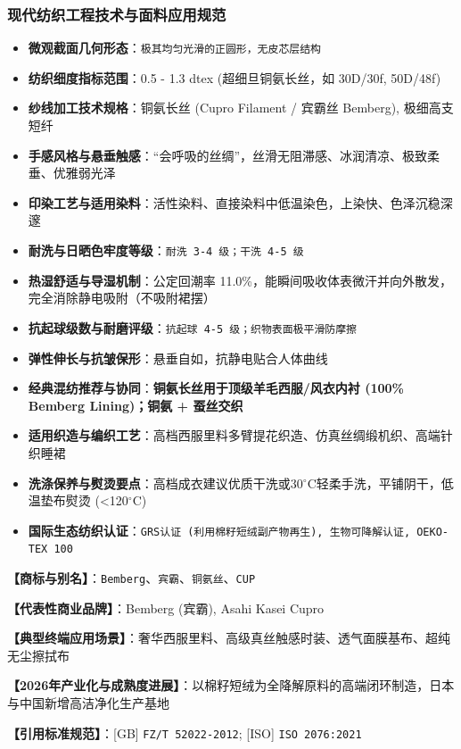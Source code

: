 \documentclass[11pt,openright,twoside,UTF8]{ctexbook}
\begin{document}
\subsubsection*{现代纺织工程技术与面料应用规范}
\begin{itemize} \setlength{\itemsep}{2pt}
    \item \textbf{微观截面几何形态}：\texttt{极其均匀光滑的正圆形，无皮芯层结构}
    \item \textbf{纺织细度指标范围}：0.5 - 1.3 dtex (超细旦铜氨长丝，如 30D/30f, 50D/48f)
    \item \textbf{纱线加工技术规格}：铜氨长丝 (Cupro Filament / 宾霸丝 Bemberg), 极细高支短纤
    \item \textbf{手感风格与悬垂触感}：“会呼吸的丝绸”，丝滑无阻滞感、冰润清凉、极致柔垂、优雅弱光泽
    \item \textbf{印染工艺与适用染料}：活性染料、直接染料中低温染色，上染快、色泽沉稳深邃
    \item \textbf{耐洗与日晒色牢度等级}：\texttt{耐洗 3-4 级；干洗 4-5 级}
    \item \textbf{热湿舒适与导湿机制}：公定回潮率 11.0\%，能瞬间吸收体表微汗并向外散发，完全消除静电吸附（不吸附裙摆）
    \item \textbf{抗起球级数与耐磨评级}：\texttt{抗起球 4-5 级；织物表面极平滑防摩擦}
    \item \textbf{弹性伸长与抗皱保形}：悬垂自如，抗静电贴合人体曲线
    \item \textbf{经典混纺推荐与协同}：\textbf{铜氨长丝用于顶级羊毛西服/风衣内衬 (100\% Bemberg Lining)；铜氨 + 蚕丝交织}
    \item \textbf{适用织造与编织工艺}：高档西服里料多臂提花织造、仿真丝绸缎机织、高端针织睡裙
    \item \textbf{洗涤保养与熨烫要点}：高档成衣建议优质干洗或30$^\circ\mathrm{C}$轻柔手洗，平铺阴干，低温垫布熨烫 (\textless{}120$^\circ\mathrm{C}$)
    \item \textbf{国际生态纺织认证}：\texttt{GRS认证 (利用棉籽短绒副产物再生), 生物可降解认证, OEKO-TEX 100}
\end{itemize}
\vspace{0.2cm}

\noindent\textbf{【商标与别名】}：\texttt{Bemberg}、\texttt{宾霸}、\texttt{铜氨丝}、\texttt{CUP}\par
\noindent\textbf{【代表性商业品牌】}：Bemberg (宾霸), Asahi Kasei Cupro\par
\noindent\textbf{【典型终端应用场景】}：奢华西服里料、高级真丝触感时装、透气面膜基布、超纯无尘擦拭布\par
\noindent\textbf{【2026年产业化与成熟度进展】}：以棉籽短绒为全降解原料的高端闭环制造，日本与中国新增高洁净化生产基地\par
\noindent\textbf{【引用标准规范】}：[GB] \texttt{FZ/T 52022-2012}; [ISO] \texttt{ISO 2076:2021}\par
\vspace{0.5cm}
\end{document}

